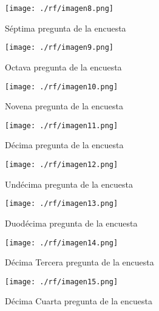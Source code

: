 \begin{figure}[H]
    \centering %
         \texttt{[image: ./rf/imagen8.png]} 
    \caption{Séptima pregunta de la encuesta \cite{}}
   \label{figure:Re1sultado 9} %
\end{figure}
\begin{figure}[H]
    \centering %
         \texttt{[image: ./rf/imagen9.png]} 
    \caption{Octava pregunta de la encuesta \cite{}}
   \label{figure:Resul1tado 10} %
\end{figure}
\begin{figure}[H]
    \centering %
         \texttt{[image: ./rf/imagen10.png]} 
    \caption{Novena pregunta de la encuesta \cite{}}
   \label{figure:Resultado 11} %
\end{figure}
\begin{figure}[H]
    \centering %
         \texttt{[image: ./rf/imagen11.png]} 
    \caption{Décima pregunta de la encuesta \cite{}}
   \label{figure:Resultado 12} %
\end{figure}
\begin{figure}[H]
    \centering %
         \texttt{[image: ./rf/imagen12.png]} 
    \caption{Undécima pregunta de la encuesta \cite{}}
   \label{figure:Resultado 13} %
\end{figure}
\begin{figure}[H]
    \centering %
         \texttt{[image: ./rf/imagen13.png]} 
    \caption{Duodécima pregunta de la encuesta \cite{}}
   \label{figure:Resultado 14} %
\end{figure}
\begin{figure}[H]
    \centering %
         \texttt{[image: ./rf/imagen14.png]} 
    \caption{Décima Tercera pregunta de la encuesta \cite{}}
   \label{figure:Resultado 15} %
\end{figure}
\begin{figure}[H]
    \centering %
         \texttt{[image: ./rf/imagen15.png]} 
    \caption{Décima Cuarta pregunta de la encuesta \cite{}}
   \label{figure:Resultado 16} %
\end{figure}

